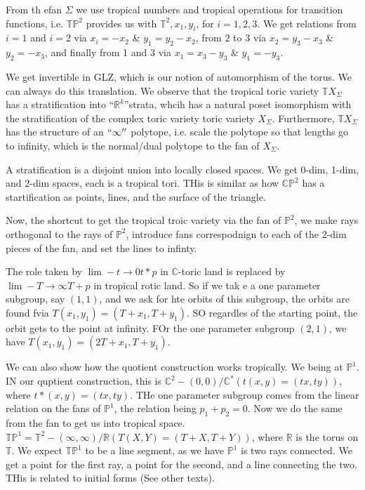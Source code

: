 \documentclass[11pt]{article}
\theoremstyle{definition}
\theoremstyle{plain}%
\theoremstyle{definition}
\def\RR{{\mathbb R}}
\def\CC{{\mathbb C}}
\def\TT{{\mathbb T}}
\def\PP{{\mathbb P}}
\begin{document}
From th efan $\Sigma$ we use tropical numbers and tropical operations for transition functions, i.e. $\TT \PP^2$ provides us with $\TT^2, x_1,y_i$, for $i=1,2,3$. We get relations from $i=1$ and $i=2$ via $x_i=-x_2$ \& $y_1=y_2-x_2$, from $2$ to $3$ via $x_2 = y_3-x_3$ \& $y_2 = -x_3$, and finally from 1 and 3 via $x_1 = x_3-y_3$ \& $y_1 = -y_3$.

We get invertible in GLZ, which is our notion of automorphism of the torus. We can always do this translation. We observe that the tropical toric variety $\TT X_\Sigma$ has a stratification into ``$\RR^k$''strata, whcih has a natural poset isomorphism with the stratification of the complex toric variety toric variety $X_\Sigma$. 
Furthermore, $\TT X_\Sigma$ has the structure of an $``\infty''$ polytope, i.e. scale the polytope so that lengths go to infinity, which is the normal/dual polytope to the fan of $X_\Sigma$.

A stratification is a disjoint union into locally closed spaces. We get 0-dim, 1-dim, and 2-dim spaces, each is a tropical tori. THis is similar as how $\CC\PP^2$ has a startification as points, lines, and the surface of the triangle. 



Now, the shortcut to get the tropical troic variety via the fan of $\PP^2$, we make rays orthogonal to the rays of $\PP^2$, introduce fans correspodnign to each of the 2-dim pieces of the fan, and set the lines to infinty.

The role taken by $\lim\limits-{t\rightarrow 0} t*p$ in $\CC$-toric land is replaced by $\lim\limits-{T \rightarrow \infty} T+p$ in tropical rotic land. So if we tak e a one parameter subgroup, say $(1,1)$, and we ask for hte orbits of this subgroup, the orbits are found fvia $T(x_1,y_1) = (T+x_1,T+y_1)$. SO regardles of the starting point, the orbit gets to the point at infinity. FOr the one parameter subgroup $(2,1)$, we have $T(x_1,y_1) = (2T+x_1, T+y_1)$.



We can also show how the quotient construction works tropically. We being at $\PP^1$. IN our quptient construction, this is $\CC^2-(0,0)/\CC^*(t(x,y)=(tx,ty))$, where $t*(x,y)=(tx,ty)$. THe one parameter subgroup comes from the linear relation on the fans of $\PP^1$, the relation being $p_1+p_2=0$. Now we do the same from the fan to get us into tropical space. $\TT\PP^1 = \TT^2 -(\infty, \infty)/\RR (T(X,Y)=(T+X,T+Y))$, where $\RR$ is the torus on $\TT$. We expect $\TT\PP^1$ to be a line segment, as we have $\PP^1$ is two rays connected. We get a point for the first ray, a point for the second, and a line connecting the two. THis is related to initial forms (See other texts).
\end{document}
